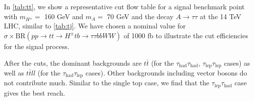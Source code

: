 In \autoref{tab:tt}, we show a representative cut flow table for a signal benchmark point with $m_{H^{\pm}}=$ 160 GeV and $m_A=$ 70 GeV and the decay $A\rightarrow\tau\tau$ at the 14 TeV LHC, similar to \autoref{tab:tj}. We have chosen a nominal value for $\sigma \times \text{BR}(pp \rightarrow tt \rightarrow H^{\pm} tb \rightarrow \tau\tau bb WW)$ of 1000 fb to illustrate the cut efficiencies for the signal process. 

After the cuts, the dominant backgrounds are $t\bar{t}$ (for the $\tau_\text{had}\tau_\text{had}$, $\tau_\text{lep}\tau_\text{lep}$ cases) as well as $t\bar{t}ll$ (for the $\tau_\text{had}\tau_\text{lep}$ cases). Other backgrounds including vector bosons do not contribute much. Similar to the single top case, we find that the $\tau_\text{lep}\tau_\text{had}$ case gives the best reach.

